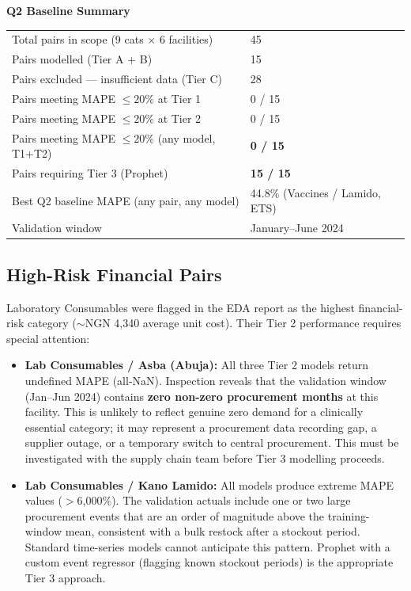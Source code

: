 \documentclass[12pt, a4paper]{article}
\begin{document}
\vspace{0.5em}

\begin{mdframed}[style=keybox]
\textbf{Q2 Baseline Summary}

\vspace{0.4em}
\begin{tabular}{@{}ll}
  Total pairs in scope (9 cats $\times$ 6 facilities) & 45 \\
  Pairs modelled (Tier A + B)                          & 15 \\
  Pairs excluded --- insufficient data (Tier C)        & 28 \\[0.3em]
  Pairs meeting MAPE $\leq 20\%$ at Tier 1             & 0 / 15 \\
  Pairs meeting MAPE $\leq 20\%$ at Tier 2             & 0 / 15 \\
  Pairs meeting MAPE $\leq 20\%$ (any model, T1+T2)    & \textbf{0 / 15} \\[0.3em]
  Pairs requiring Tier 3 (Prophet)                     & \textbf{15 / 15} \\
  Best Q2 baseline MAPE (any pair, any model)          & 44.8\% (Vaccines / Lamido, ETS) \\
  Validation window                                    & January--June 2024 \\
\end{tabular}
\end{mdframed}

\subsection{High-Risk Financial Pairs}

Laboratory Consumables were flagged in the EDA report as the
highest financial-risk category ($\sim$NGN 4,340 average unit cost).
Their Tier 2 performance requires special attention:

\begin{itemize}[leftmargin=1.5em, itemsep=4pt]
  \item \textbf{Lab Consumables / Asba (Abuja):} All three Tier 2 models
        return undefined MAPE (all-NaN). Inspection reveals that the
        validation window (Jan--Jun 2024) contains \textbf{zero non-zero
        procurement months} at this facility. This is unlikely to reflect
        genuine zero demand for a clinically essential category; it may
        represent a procurement data recording gap, a supplier outage, or
        a temporary switch to central procurement. This must be investigated
        with the supply chain team before Tier 3 modelling proceeds.

  \item \textbf{Lab Consumables / Kano Lamido:} All models produce extreme
        MAPE values ($>$6,000\%). The validation actuals include one or two
        large procurement events that are an order of magnitude above the
        training-window mean, consistent with a bulk restock after a stockout
        period. Standard time-series models cannot anticipate this pattern.
        Prophet with a custom event regressor (flagging known stockout periods)
        is the appropriate Tier 3 approach.
\end{itemize}
\end{document}
